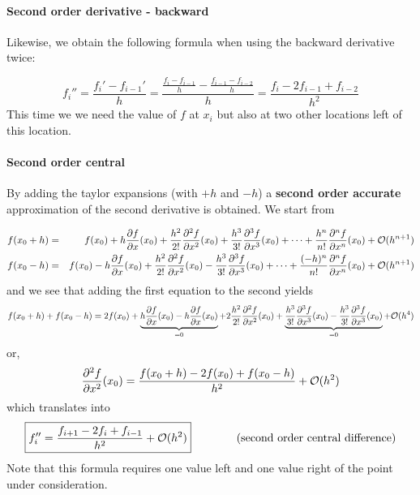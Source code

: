 \paragraph{Second order derivative - backward}
Likewise, we obtain the following formula when using the backward derivative twice:

\begin{equation}
f_{i}'' 
= \frac{f_{i}'-f_{i-1}'}{h} 
= \frac{\frac{f_{i}-f_{i-1}}{h}- \frac{f_{i-1}-f_{i-2}}{h}  }{h} 
= \frac{f_{i}-2f_{i-1}+f_{i-2}}{h^2} 
\end{equation}
This time we  we need the value of $f$ at $x_i$ but also at two 
other locations left of this location.

\paragraph{Second order central} 
By adding the taylor expansions (with $+h$ and $-h$) 
a {\bf second order accurate}  approximation of the second derivative is obtained.
We start from 

\begin{eqnarray}
f(x_0+h)&=&f(x_0)+ 
h \frac{\partial f}{\partial x}(x_0)  + 
\frac{h^2}{2!} \frac{\partial^2 f}{\partial x^2}(x_0)  +
\frac{h^3}{3!} \frac{\partial^3 f}{\partial x^3}(x_0)  +
\dots  +
\frac{h^n}{n!} \frac{\partial^n f}{\partial x^n}(x_0)  
+ {\cal O}(h^{n+1}) 
\nonumber\\
f(x_0-h)&=&f(x_0) 
-h \frac{\partial f}{\partial x}(x_0)  + 
\frac{h^2}{2!} \frac{\partial^2 f}{\partial x^2}(x_0)  -
\frac{h^3}{3!} \frac{\partial^3 f}{\partial x^3}(x_0)  +
\dots  +
\frac{(-h)^n}{n!} \frac{\partial^n f}{\partial x^n}(x_0)  
+ {\cal O}(h^{n+1}) \nonumber
\end{eqnarray}
and we see that adding the first equation to the second yields
\begin{equation}
f(x_0+h) + f(x_0-h) =2 f(x_0)+ 
\underbrace{h \frac{\partial f}{\partial x}(x_0)   
-h \frac{\partial f}{\partial x}(x_0)}_{=0}  + 
2\frac{h^2}{2!} \frac{\partial^2 f}{\partial x^2}(x_0)  
+
\underbrace{
\frac{h^3}{3!} \frac{\partial^3 f}{\partial x^3}(x_0)  
-\frac{h^3}{3!} \frac{\partial^3 f}{\partial x^3}(x_0)  
}_{=0}
+ {\cal O}(h^{4})
\end{equation}
or, 
\begin{equation}
\frac{\partial^2 f}{\partial x^2}(x_0)  =
\frac{f(x_0+h) -2f(x_0) + f(x_0-h) }{h^2}
+ {\cal O}(h^2)
\end{equation}
which translates into
\begin{equation}
\boxed{
f_{i}''=\frac{f_{i+1}-2f_i+f_{i-1}}{h^2} + {\cal O}(h^2)
}
\qquad
\qquad
\text{(second order central difference)}
\end{equation}
Note that this formula requires one value left and one value right of the point 
under consideration. 

